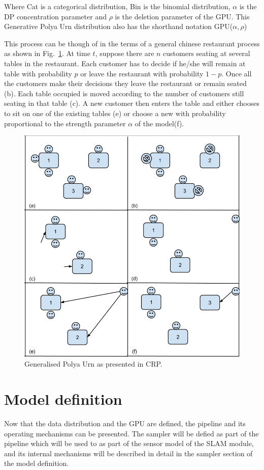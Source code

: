 \documentclass[twoside,hidelinks]{article}
\begin{document}
Where Cat is a categorical distribution, Bin is the binomial distribution, $\alpha$ is the DP concentration parameter and $\rho$ is the deletion parameter of the GPU. This Generative Polya Urn distribution also has the shorthand notation GPU($\alpha,\rho$)

This process can be though of in the terms of a general chinese restaurant process\cite{antoniak} as shown in Fig.~\ref{generalPolya}. At time $t$, suppose there are $n$ customers seating at several tables in the restaurant. Each customer has to decide if he/she will remain at table with probability $p$ or leave the restaurant with probability $1-p$. Once all the customers make their decisions they leave the restaurant or remain seated (b). Each table occupied is moved according to the number of customers still seating in that table (c). A new customer then enters the table and either chooses to sit on one of the existing tables (e) or choose a new with probability proportional to the strength parameter $\alpha$ of the model(f).



\begin{figure}[h!]
  \centering
    \includegraphics[width=.65\textwidth]{generalPolya}
    \caption{Generalised Polya Urn as presented in CRP.}
  \label{generalPolya}
\end{figure}

\section{Model definition}
\label{sec:model}

Now that the data distribution and the GPU are defined, the pipeline and its operating mechanisms can be presented. The sampler will be defied as part of the pipeline which will be used to as part of the sensor model of the SLAM module, and its internal mechanisms will be described in detail in the sampler section of the model definition.
\end{document}
